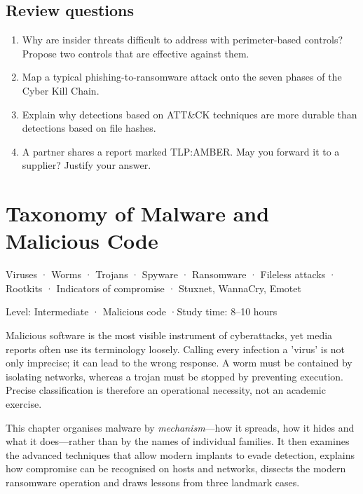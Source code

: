 \documentclass[11pt,openany]{book}
\newcommand{\chaptermeta}[3]{%
  {\sffamily\small\color{accent}#1\par}\vspace{0.3em}
  {\sffamily\footnotesize\color{gray}#2 \quad·\quad #3\par}\vspace{1.2em}}
\begin{document}
\section*{Review questions}
\begin{enumerate}
  \item Why are insider threats difficult to address with perimeter-based controls? Propose two controls that are effective against them.
  \item Map a typical phishing-to-ransomware attack onto the seven phases of the Cyber Kill Chain.
  \item Explain why detections based on ATT\&CK techniques are more durable than detections based on file hashes.
  \item A partner shares a report marked TLP:AMBER. May you forward it to a supplier? Justify your answer.
\end{enumerate}

\chapter{Taxonomy of Malware and Malicious Code}\label{ch:4}
\chaptermeta{Viruses · Worms · Trojans · Spyware · Ransomware · Fileless attacks · Rootkits · Indicators of compromise · Stuxnet, WannaCry, Emotet}{Level: Intermediate · Malicious code}{Study time: 8–10 hours}

Malicious software is the most visible instrument of cyberattacks, yet media reports often use its terminology loosely. Calling every infection a 'virus' is not only imprecise; it can lead to the wrong response. A worm must be contained by isolating networks, whereas a trojan must be stopped by preventing execution. Precise classification is therefore an operational necessity, not an academic exercise.

This chapter organises malware by \emph{mechanism}—how it spreads, how it hides and what it does—rather than by the names of individual families. It then examines the advanced techniques that allow modern implants to evade detection, explains how compromise can be recognised on hosts and networks, dissects the modern ransomware operation and draws lessons from three landmark cases.
\end{document}
